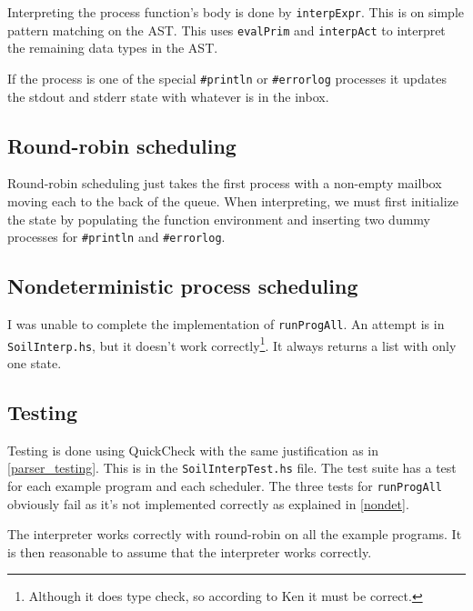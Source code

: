 Interpreting the process function's body is done by \verb|interpExpr|. This is
on simple pattern matching on the AST. This uses \verb|evalPrim| and
\verb|interpAct| to interpret the remaining data types in the AST.

If the process is one of the special \verb|#println| or \verb|#errorlog|
processes it updates the stdout and stderr state with whatever is in the inbox.

\subsection{Round-robin scheduling}

Round-robin scheduling just takes the first process with a non-empty mailbox
moving each to the back of the queue. When interpreting, we must first
initialize the state by populating the function environment and inserting two
dummy processes for \verb|#println| and \verb|#errorlog|.

\subsection{Nondeterministic process scheduling}
\label{nondet}

I was unable to complete the implementation of \verb|runProgAll|. An attempt is
in \verb|SoilInterp.hs|, but it doesn't work correctly\footnote{Although it
does type check, so according to Ken it must be correct.}. It always returns a
list with only one state.

\subsection{Testing}

Testing is done using QuickCheck with the same justification as in
\autoref{parser_testing}. This is in the \verb|SoilInterpTest.hs| file. The
test suite has a test for each example program and each scheduler. The three
tests for \verb|runProgAll| obviously fail as it's not implemented correctly as
explained in \autoref{nondet}.

The interpreter works correctly with round-robin on all the example programs.
It is then reasonable to assume that the interpreter works correctly.

